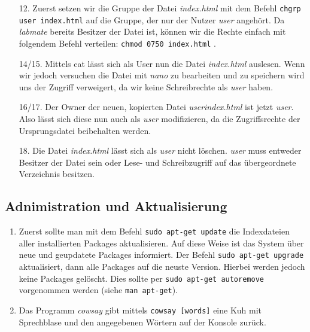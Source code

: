 \documentclass{scrartcl}
\begin{document}
\begin{enumerate}[1.]
      \item [12.] Zuerst setzen wir die Gruppe der Datei \textit{index.html} mit dem Befehl
            \texttt{chgrp user index.html} auf die Gruppe, der nur der Nutzer
            \textit{user} angehört. Da \textit{labmate} bereits Besitzer der Datei
            ist, können wir die Rechte einfach mit folgendem Befehl verteilen:
            \texttt{chmod 0750 index.html} .
      \item [14/15.] Mittels cat lässt sich als User nun die Datei \textit{index.html}
            auslesen. Wenn wir jedoch versuchen die Datei mit \textit{nano} zu
            bearbeiten und zu speichern wird uns der Zugriff verweigert, da wir
            keine Schreibrechte als \textit{user} haben.
      \item [16/17.] Der Owner der neuen, kopierten Datei \textit{userindex.html}
            ist jetzt \textit{user}. Also lässt sich diese nun auch als \textit{user}
            modifizieren, da die Zugriffsrechte der Ursprungsdatei beibehalten werden.
      \item [18.] Die Datei \textit{index.html} lässt sich als \textit{user} nicht
            löschen. \textit{user} muss entweder Besitzer der Datei sein oder
            Lese- und Schreibzugriff auf das übergeordnete Verzeichnis besitzen.
    \end{enumerate}

    \subsection{Adnimistration und Aktualisierung}
    \label{sub:Adnimistration und Aktualisierung}

    \begin{enumerate} [1.]
      \item Zuerst sollte man mit dem Befehl \texttt{sudo apt-get update} die
            Indexdateien aller installierten Packages aktualisieren. Auf diese
            Weise ist das System über neue und geupdatete Packages informiert.
            Der Befehl \texttt{sudo apt-get upgrade} aktualisiert, dann alle
            Packages auf die neuste Version. Hierbei werden jedoch keine Packages
            gelöscht. Dies sollte per \texttt{sudo apt-get autoremove} vorgenommen
            werden (siehe \texttt{man apt-get}).
      \item Das Programm \textit{cowsay} gibt mittels \texttt{cowsay [words]} eine
            Kuh mit Sprechblase und den angegebenen Wörtern auf der Konsole zurück.
    \end{enumerate}
\end{document}
